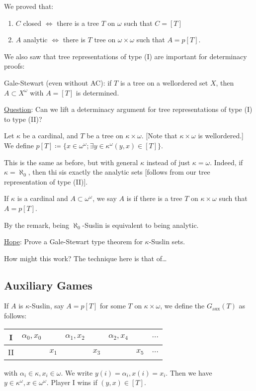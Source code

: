 \documentclass[]{article}
\newcommand{\om}{\omega}
\begin{document}
We proved that:
\begin{enumerate}[label = (\Roman*)]
    \item $C$ closed $\iff$ there is a tree $T$ on $\omega$ such that $C = [T]$
    \item $A$ analytic $\iff$ there is $T$ tree on $\om\times\om$ such that $A = p[T]$.
\end{enumerate}
We also saw that tree representations of type (I) are important for determinacy proofs:

Gale-Stewart (even without AC): if $T$ is a tree on a wellordered set $X$, then $A\subset X^\om$ with $A = [T]$ is determined.

\underline{Question}: Can we lift a determinacy argument for tree representations of type (I) to type (II)?

\begin{defin*}
    Let $\kappa$ be a cardinal, and $T$ be a tree on $\kappa \times \omega$. [Note that $\kappa\times \om$ is wellordered.] We define $p[T] \coloneqq \{x \in \om^\om; \exists y \in \kappa^\om (y,x) \in [T]\}$. 
\end{defin*}
\begin{remark*}
    This is the same as before, but with general $\kappa$ instead of just $\kappa = \omega$. Indeed, if $\kappa = \aleph_0$, then thi sis exactly the analytic sets [follows from our tree representation of type (II)].
\end{remark*}
\begin{defin*}
    If $\kappa$ is a cardinal and $A\subset \om^\om$, we say $A$ is  if there is a tree $T$ on $\kappa \times \om$ such that $A = p[T]$.
\end{defin*}
By the remark, being $\aleph_0$-Suslin is equivalent to being analytic.

\underline{Hope}: Prove a Gale-Stewart type theorem for $\kappa$-Suslin sets.

How might this work? The technique here is that of\dots

\subsection*{Auxiliary Games}
\begin{defin*}
    If $A$ is $\kappa$-Suslin, say $A = p[T]$ for some $T$ on $\kappa \times \omega$, we define the  $G_\textrm{aux}(T)$ as follows:
    \begin{center}
        \begin{tabular}{c|ccccccc}
            I & $\alpha_0,x_0$ & & $\alpha_1,x_2$ & & $\alpha_2,x_4 $& & $\dots $\\ \hline
            II & & $x_1$ & & $x_3 $& &$ x_5$ & $\dots$ 
        \end{tabular}
    \end{center}
    with $\alpha_i \in \kappa,x_i \in \om$. We write $y(i) = \alpha_i,x(i) =x_i$. Then we have $y  \in \kappa^\om,x \in \om^\om$. Player I wins if $(y,x) \in [T]$.
\end{defin*}
\end{document}

